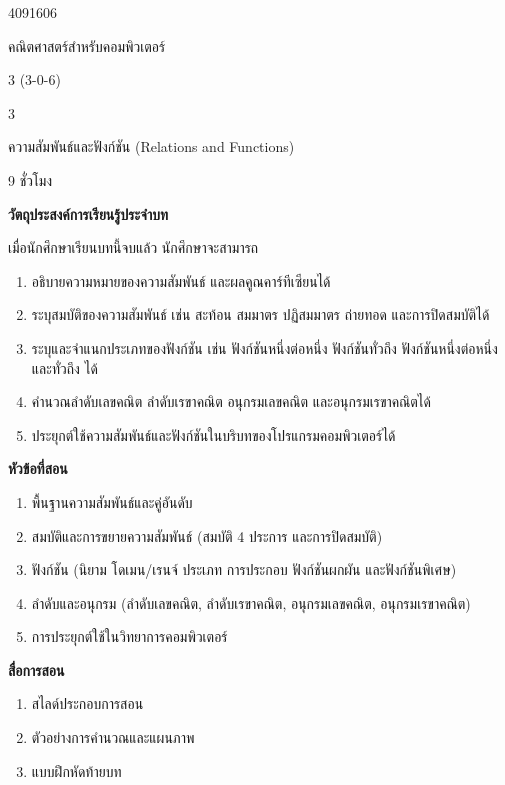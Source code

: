 
\begin{description}[leftmargin=2cm, style=nextline, itemsep=0.1em, parsep=0pt]
    \item[รหัสวิชา] 4091606
    \item[ชื่อวิชา] คณิตศาสตร์สำหรับคอมพิวเตอร์
    \item[หน่วยกิต] 3 (3-0-6)
    \item[บทที่] 3
    \item[ชื่อบท] ความสัมพันธ์และฟังก์ชัน (Relations and Functions)
    \item[จำนวนชั่วโมง] 9 ชั่วโมง
\end{description}

\noindent \textbf{\large วัตถุประสงค์การเรียนรู้ประจำบท}\par\vspace{0.2em}\noindent
\noindent เมื่อนักศึกษาเรียนบทนี้จบแล้ว นักศึกษาจะสามารถ
\begin{enumerate}[topsep=0.2em, itemsep=0.15em, leftmargin=*]
    \item อธิบายความหมายของความสัมพันธ์ และผลคูณคาร์ทีเซียนได้
    \item ระบุสมบัติของความสัมพันธ์ เช่น สะท้อน สมมาตร ปฏิสมมาตร ถ่ายทอด และการปิดสมบัติได้
    \item ระบุและจำแนกประเภทของฟังก์ชัน เช่น ฟังก์ชันหนึ่งต่อหนึ่ง ฟังก์ชันทั่วถึง ฟังก์ชันหนึ่งต่อหนึ่งและทั่วถึง ได้
    \item คำนวณลำดับเลขคณิต ลำดับเรขาคณิต อนุกรมเลขคณิต และอนุกรมเรขาคณิตได้
    \item ประยุกต์ใช้ความสัมพันธ์และฟังก์ชันในบริบทของโปรแกรมคอมพิวเตอร์ได้
\end{enumerate}

\noindent \textbf{\large หัวข้อที่สอน}\par\vspace{0.2em}\noindent
\begin{enumerate}[topsep=0.2em, itemsep=0.15em, leftmargin=*]
    \item พื้นฐานความสัมพันธ์และคู่อันดับ
    \item สมบัติและการขยายความสัมพันธ์ (สมบัติ 4 ประการ และการปิดสมบัติ)
    \item ฟังก์ชัน (นิยาม โดเมน/เรนจ์ ประเภท การประกอบ ฟังก์ชันผกผัน และฟังก์ชันพิเศษ)
    \item ลำดับและอนุกรม (ลำดับเลขคณิต, ลำดับเรขาคณิต, อนุกรมเลขคณิต, อนุกรมเรขาคณิต)
    \item การประยุกต์ใช้ในวิทยาการคอมพิวเตอร์
\end{enumerate}

\noindent \textbf{\large สื่อการสอน}
\begin{enumerate}[topsep=0.2em, itemsep=0.15em, leftmargin=*]
    \item สไลด์ประกอบการสอน
    \item ตัวอย่างการคำนวณและแผนภาพ
    \item แบบฝึกหัดท้ายบท
\end{enumerate}
